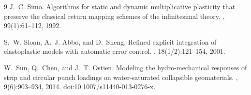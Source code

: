 \documentclass[12pt]{article}
\begin{document}
\begin{thebibliography}{9}
J.~C. Simo.
\newblock Algorithms for static and dynamic multiplicative plasticity that
  preserve the classical return mapping schemes of the infinitesimal theory.
,
  99(1):61--112, 1992.

S.~W. Sloan, A.~J. Abbo, and D.~Sheng.
\newblock Refined explicit integration of elastoplastic models with automatic
  error control.
, 18(1/2):121--154, 2001.

W.~Sun, Q.~Chen, and J.~T. Ostien.
\newblock Modeling the hydro-mechanical responses of strip and circular punch
  loadings on water-saturated collapsible geomaterials.
, 9(6):903--934, 2014.
\newblock doi:10.1007/s11440-013-0276-x.

\end{thebibliography}
\end{document}
